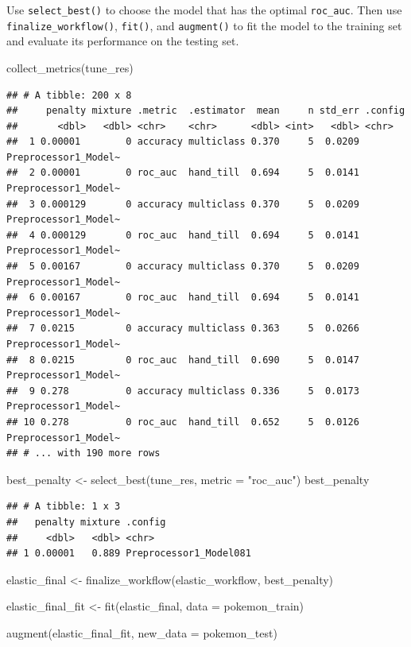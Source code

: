 \documentclass[
]{article}
\newenvironment{Shaded}{\begin{snugshade}}{\end{snugshade}}
\newcommand{\AttributeTok}[1]{\textcolor[rgb]{0.77,0.63,0.00}{#1}}
\newcommand{\FunctionTok}[1]{\textcolor[rgb]{0.00,0.00,0.00}{#1}}
\newcommand{\NormalTok}[1]{#1}
\newcommand{\OtherTok}[1]{\textcolor[rgb]{0.56,0.35,0.01}{#1}}
\newcommand{\StringTok}[1]{\textcolor[rgb]{0.31,0.60,0.02}{#1}}
\begin{document}
Use \texttt{select\_best()} to choose the model that has the optimal
\texttt{roc\_auc}. Then use \texttt{finalize\_workflow()},
\texttt{fit()}, and \texttt{augment()} to fit the model to the training
set and evaluate its performance on the testing set.

\begin{Shaded}
\begin{Highlighting}[]
\FunctionTok{collect\_metrics}\NormalTok{(tune\_res)}
\end{Highlighting}
\end{Shaded}

\begin{verbatim}
## # A tibble: 200 x 8
##     penalty mixture .metric  .estimator  mean     n std_err .config             
##       <dbl>   <dbl> <chr>    <chr>      <dbl> <int>   <dbl> <chr>               
##  1 0.00001        0 accuracy multiclass 0.370     5  0.0209 Preprocessor1_Model~
##  2 0.00001        0 roc_auc  hand_till  0.694     5  0.0141 Preprocessor1_Model~
##  3 0.000129       0 accuracy multiclass 0.370     5  0.0209 Preprocessor1_Model~
##  4 0.000129       0 roc_auc  hand_till  0.694     5  0.0141 Preprocessor1_Model~
##  5 0.00167        0 accuracy multiclass 0.370     5  0.0209 Preprocessor1_Model~
##  6 0.00167        0 roc_auc  hand_till  0.694     5  0.0141 Preprocessor1_Model~
##  7 0.0215         0 accuracy multiclass 0.363     5  0.0266 Preprocessor1_Model~
##  8 0.0215         0 roc_auc  hand_till  0.690     5  0.0147 Preprocessor1_Model~
##  9 0.278          0 accuracy multiclass 0.336     5  0.0173 Preprocessor1_Model~
## 10 0.278          0 roc_auc  hand_till  0.652     5  0.0126 Preprocessor1_Model~
## # ... with 190 more rows
\end{verbatim}

\begin{Shaded}
\begin{Highlighting}[]
\NormalTok{best\_penalty }\OtherTok{\textless{}{-}} \FunctionTok{select\_best}\NormalTok{(tune\_res, }\AttributeTok{metric =} \StringTok{"roc\_auc"}\NormalTok{)}
\NormalTok{best\_penalty}
\end{Highlighting}
\end{Shaded}

\begin{verbatim}
## # A tibble: 1 x 3
##   penalty mixture .config               
##     <dbl>   <dbl> <chr>                 
## 1 0.00001   0.889 Preprocessor1_Model081
\end{verbatim}

\begin{Shaded}
\begin{Highlighting}[]
\NormalTok{elastic\_final }\OtherTok{\textless{}{-}} \FunctionTok{finalize\_workflow}\NormalTok{(elastic\_workflow, best\_penalty)}

\NormalTok{elastic\_final\_fit }\OtherTok{\textless{}{-}} \FunctionTok{fit}\NormalTok{(elastic\_final, }\AttributeTok{data =}\NormalTok{ pokemon\_train)}

\FunctionTok{augment}\NormalTok{(elastic\_final\_fit, }\AttributeTok{new\_data =}\NormalTok{ pokemon\_test) }
\end{Highlighting}
\end{Shaded}
\end{document}
